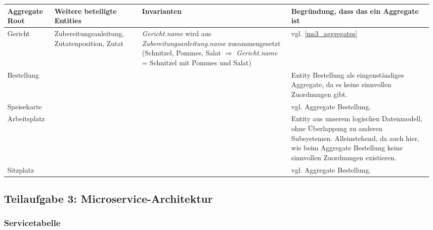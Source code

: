 \begin{center}
\begin{tabu} to 
\hline{}
Aggregate Root &Weitere beteiligte Entities &Invarianten
  &Begr\"undung, dass das ein Aggregate ist \\
\hline
Gericht &Zubereitungsanleitung, Zutatenposition, Zutat
  &\textit{Gericht.name} wird aus
  \textit{Zubereitungsanleitung.name}
  zusammengesetzt (Schnitzel, Pommes, Salat $\Rightarrow$
  \textit{Gericht.name} = Schnitzel mit Pommes und Salat)
  &vgl. \ref{ms3_aggregates} \\
\hline
Bestellung & & &Entity Bestellung als eingenst\"andiges
  Aggregate, da es keine sinnvollen Zuordnungen gibt.\\
\hline
Speisekarte & & &vgl. Aggregate Bestellung. \\
\hline
Arbeitsplatz & & &Entity aus unserem logischen Datenmodell,
  ohne \"Uberlappung zu anderen Subsystemen. Alleinstehend,
  da auch hier, wie beim Aggregate Bestellung keine
  sinnvollen Zuordnungen existieren. \\
\hline
Sitzplatz & & &vgl. Aggregate Bestellung. \\
\hline
\end{tabu}
\end{center}

\subsection{Teilaufgabe 3: Microservice-Architektur}

\subsubsection{Servicetabelle}

